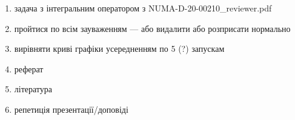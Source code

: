 \begin{enumerate}
    \item задача з інтегральним оператором з NUMA-D-20-00210\_reviewer.pdf
    \item пройтися по всім зауваженням --- або видалити або розприсати нормально
    \item вирівняти криві графіки усередненням по 5 (?) запускам
    \item реферат
    \item література
    \item репетиція презентації/доповіді
\end{enumerate} 